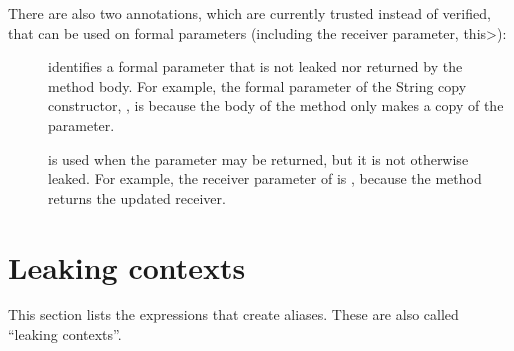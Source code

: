 There are also two annotations, which are currently trusted instead of verified,
that can be used on formal parameters (including
the receiver parameter, \<this>):

\begin{description}

\item[]
identifies a formal parameter that is not leaked nor
returned by the method body.
For example, the formal parameter of the String copy constructor,
, is  because the body of the method
only makes a copy of the parameter.

\item[]
is used when the parameter may be returned, but it is not
otherwise leaked.
For example, the receiver parameter of  is
, because the method returns the updated receiver.

\end{description}

\section{Leaking contexts\label{aliasing-leaking-contexts}}
This section lists the expressions that create aliases.  These are also
called ``leaking contexts''.


